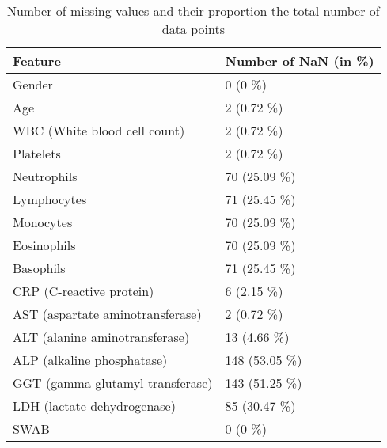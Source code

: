 \begin{table}
\centering
\begin{tabular}{ll}
Feature                          & Number of NaN (in \%) \\ \hline
Gender                           & 0 (0 \%)              \\
Age                              & 2 (0.72 \%)           \\
WBC (White blood cell count)     & 2 (0.72 \%)           \\
Platelets                        & 2 (0.72 \%)           \\
Neutrophils                      & 70 (25.09 \%)         \\
Lymphocytes                      & 71 (25.45 \%)         \\
Monocytes                        & 70 (25.09 \%)         \\
Eosinophils                      & 70 (25.09 \%)         \\
Basophils                        & 71 (25.45 \%)         \\
CRP (C-reactive protein)         & 6 (2.15 \%)           \\
AST (aspartate aminotransferase) & 2 (0.72 \%)           \\
ALT (alanine aminotransferase)   & 13 (4.66 \%)          \\
ALP (alkaline phosphatase)       & 148 (53.05 \%)        \\
GGT (gamma glutamyl transferase) & 143 (51.25 \%)        \\
LDH (lactate dehydrogenase)      & 85 (30.47 \%)         \\
SWAB                             & 0 (0 \%)             
\end{tabular}
\caption{Number of missing values and their proportion the total number of data 
points}
\label{tab:nan-overview}
\end{table}
